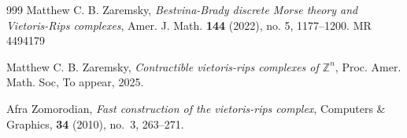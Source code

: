 \documentclass{amsart}
\theoremstyle{definition}
\theoremstyle{remark}
\numberwithin{equation}{section}
\begin{document}
{\begin{thebibliography}{999}
Matthew C. B. Zaremsky, {\em Bestvina-Brady discrete Morse theory and Vietoris-Rips complexes}, Amer. J. Math. {\bf 144} (2022), no. 5, 1177--1200. MR 4494179

Matthew C. B. Zaremsky, {\em Contractible vietoris-rips complexes of $\mathbb{Z}^n$}, Proc. Amer. Math. Soc, To appear, 2025.

Afra Zomorodian, {\em Fast construction of the vietoris-rips complex}, Computers \& Graphics, {\bf 34} (2010), no.~3, 263--271.

 \end{thebibliography}
















}
\end{document}
